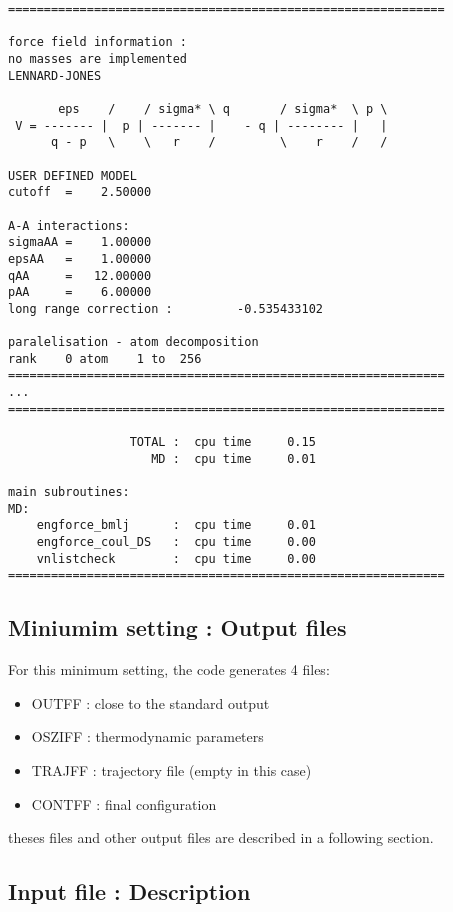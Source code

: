 \documentclass[a4paper]{article}
\begin{document}
\begin{verbatim}
=============================================================

force field information :                      
no masses are implemented                      
LENNARD-JONES                  

       eps    /    / sigma* \ q       / sigma*  \ p \
 V = ------- |  p | ------- |    - q | -------- |   |
      q - p   \    \   r    /         \    r    /   /

USER DEFINED MODEL                             
cutoff  =    2.50000

A-A interactions:
sigmaAA =    1.00000
epsAA   =    1.00000
qAA     =   12.00000
pAA     =    6.00000
long range correction :         -0.535433102
 
paralelisation - atom decomposition
rank    0 atom    1 to  256
=============================================================
...
=============================================================

                 TOTAL :  cpu time     0.15
                    MD :  cpu time     0.01

main subroutines:
MD:
    engforce_bmlj      :  cpu time     0.01
    engforce_coul_DS   :  cpu time     0.00
    vnlistcheck        :  cpu time     0.00
=============================================================
\end{verbatim}

\subsection{Miniumim setting : Output files}
For this minimum setting, the code generates 4 files:

\begin{itemize}
\item OUTFF  : close to the standard output
\item OSZIFF : thermodynamic parameters 
\item TRAJFF : trajectory file (empty in this case) 
\item CONTFF : final configuration
\end{itemize}
theses files and other output files are described in a following section.

\subsection{Input file : Description}

\end{document}
